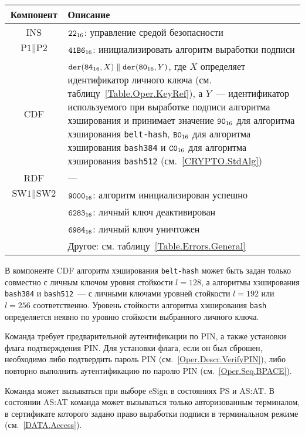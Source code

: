 \begin{table}[hbt]
\caption{}\label{Table.Oper.SetDSTCmd}
\begin{tabular}{|c|p{14cm}|}
\hline
Компонент & Описание \\
\hline
\hline
INS & $\texttt{22}_{16}$: управление средой безопасности\\ 
\hline
$\text{P1} \parallel\text{P2}$ & $\texttt{41B6}_{16}$: 
инициализировать алгоритм выработки подписи \\
\hline
CDF & 
$\texttt{der}(\texttt{84}_{16}, X) \parallel \texttt{der}(\texttt{80}_{16}, Y)$, 
где $X$ определяет идентификатор личного ключа (см. таблицу~\ref{Table.Oper.KeyRef}), 
а $Y$~--- идентификатор используемого при выработке подписи алгоритма 
хэширования и принимает значение $\texttt{90}_{16}$ для алгоритма хэширования 
\texttt{belt-hash}, $\texttt{B0}_{16}$ для алгоритма хэширования \texttt{bash384} и 
$\texttt{C0}_{16}$ для алгоритма хэширования \texttt{bash512} (см.~\ref{CRYPTO.StdAlg})\\
\hline 
\hline
RDF &  --- \\
\hline
$\text{SW1} \parallel \text{SW2}$ & 
$\texttt{9000}_{16}$: алгоритм инициализирован успешно \\
\cline{2-2}
  & $\texttt{6283}_{16}$: личный ключ деактивирован \\
\cline{2-2}
  & $\texttt{6984}_{16}$: личный ключ уничтожен \\
\cline{2-2}
  & Другое: см. таблицу~\ref{Table.Errors.General} \\
\hline
\end{tabular}
\end{table}

В компоненте CDF алгоритм хэширования \texttt{belt-hash}
может быть задан только совместно с личным ключом 
уровня стойкости $l=128$,
а алгоритмы хэширования \texttt{bash384} и \texttt{bash512}~--- 
с личными ключами уровней стойкости $l=192$ или $l=256$
соответственно.
Уровень стойкости алгоритма хэширования \texttt{bash} определяется 
неявно по уровню стойкости выбранного личного ключа.

Команда требует предварительной аутентификации по PIN,
а также установки флага подтверждения PIN. Для установки флага, 
если он был сброшен, необходимо либо подтвердить пароль PIN 
(см.~\ref{Oper.Descr.VerifyPIN}), либо повторно выполнить аутентификацию по 
паролю PIN (см.~\ref{Oper.Seq.BPACE}). 

Команда может вызываться при выборе eSign в состояниях PS и AS:AT. В состоянии 
AS:AT команда может вызываться только авторизованным терминалом,
в сертификате которого задано право выработки подписи в терминальном режиме 
(см.~\ref{DATA.Access}). 


